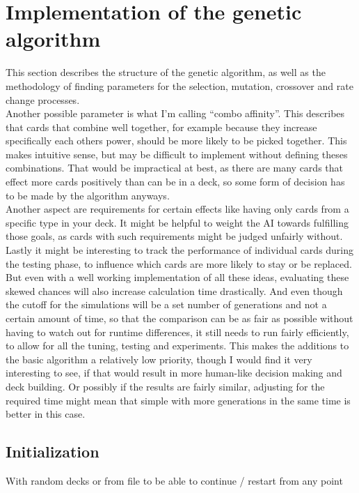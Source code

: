 \section{Implementation of the genetic algorithm}
\label{sec:method:genalg}
This section describes the structure of the genetic algorithm, as well as the methodology of finding parameters for the selection, mutation, crossover and rate change processes. \\
Another possible parameter is what I’m calling “combo affinity”. This describes that cards that combine well together, for example because they increase specifically each others power, should be more likely to be picked together. This makes intuitive sense, but may be difficult to implement without defining theses combinations. That would be impractical at best, as there are many cards that effect more cards positively than can be in a deck, so some form of decision has to be made by the algorithm anyways. \\
Another aspect are requirements for certain effects like having only cards from a specific type in your deck. It might be helpful to weight the AI towards fulfilling those goals, as cards with such requirements might be judged unfairly without. \\
Lastly it might be interesting to track the performance of individual cards during the testing phase, to influence which cards are more likely to stay or be replaced. \\
But even with a well working implementation of all these ideas, evaluating these skewed chances will also increase calculation time drastically. And even though the cutoff for the simulations will be a set number of generations and not a certain amount of time, so that the comparison can be as fair as possible without having to watch out for runtime differences, it still needs to run fairly efficiently, to allow for all the tuning, testing and experiments.
This makes the additions to the basic algorithm a relatively low priority, though I would find it very interesting to see, if that would result in more human-like decision making and deck building. Or possibly if the results are fairly similar, adjusting for the required time might mean that simple with more generations in the same time is better in this case. \\

\subsection{Initialization}
\label{sec:method:genalg:init}
With random decks or from file to be able to continue / restart from any point


